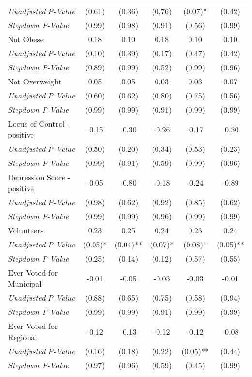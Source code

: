 \begin{tabular}{l c c c c c}
\quad \textit{Unadjusted P-Value} & (0.61) & (0.36) & (0.76) & (0.07)* & (0.42) \\
\quad \textit{Stepdown P-Value} & (0.99) & (0.98) & (0.91) & (0.56) & (0.99) \\
Not Obese & 0.18 & 0.10 & 0.18 & 0.10 & 0.10 \\
\quad \textit{Unadjusted P-Value} & (0.10) & (0.39) & (0.17) & (0.47) & (0.42) \\
\quad \textit{Stepdown P-Value} & (0.89) & (0.99) & (0.52) & (0.99) & (0.96) \\
Not Overweight & 0.05 & 0.05 & 0.03 & 0.03 & 0.07 \\
\quad \textit{Unadjusted P-Value} & (0.60) & (0.62) & (0.80) & (0.75) & (0.56) \\
\quad \textit{Stepdown P-Value} & (0.99) & (0.99) & (0.91) & (0.99) & (0.99) \\
Locus of Control - positive & -0.15 & -0.30 & -0.26 & -0.17 & -0.30 \\
\quad \textit{Unadjusted P-Value} & (0.50) & (0.20) & (0.34) & (0.53) & (0.23) \\
\quad \textit{Stepdown P-Value} & (0.99) & (0.91) & (0.59) & (0.99) & (0.96) \\
Depression Score - positive & -0.05 & -0.80 & -0.18 & -0.24 & -0.89 \\
\quad \textit{Unadjusted P-Value} & (0.98) & (0.62) & (0.92) & (0.85) & (0.62) \\
\quad \textit{Stepdown P-Value} & (0.99) & (0.99) & (0.96) & (0.99) & (0.99) \\
Volunteers & 0.23 & 0.25 & 0.24 & 0.23 & 0.24 \\
\quad \textit{Unadjusted P-Value} & (0.05)* & (0.04)** & (0.07)* & (0.08)* & (0.05)** \\
\quad \textit{Stepdown P-Value} & (0.25) & (0.14) & (0.12) & (0.57) & (0.55) \\
Ever Voted for Municipal & -0.01 & -0.05 & -0.03 & -0.03 & -0.01 \\
\quad \textit{Unadjusted P-Value} & (0.88) & (0.65) & (0.75) & (0.58) & (0.94) \\
\quad \textit{Stepdown P-Value} & (0.99) & (0.99) & (0.91) & (0.99) & (0.99) \\
Ever Voted for Regional & -0.12 & -0.13 & -0.12 & -0.12 & -0.08 \\
\quad \textit{Unadjusted P-Value} & (0.16) & (0.18) & (0.22) & (0.05)** & (0.44) \\
\quad \textit{Stepdown P-Value} & (0.97) & (0.96) & (0.59) & (0.45) & (0.99) \\

\end{tabular}
